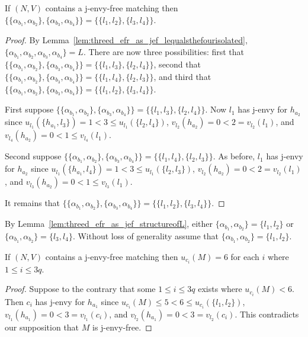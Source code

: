 \begin{lem}
\label{lem:threed_efr_as_jef_structureofL}
If $(N, V)$ contains a j-envy-free matching then $\{ \{ \alpha_{b_1}, \alpha_{b_2} \}, \{ \alpha_{b_3}, \alpha_{b_4} \} \} = \{ \{ l_1, l_2 \}, \{ l_3, l_4 \} \}$.
\end{lem}
\begin{proof}
By Lemma~\ref{lem:threed_efr_as_jef_lequalsthefourisolated}, $\{ \alpha_{b_1}, \alpha_{b_2}, \alpha_{b_3}, \alpha_{b_4} \} = L$. There are now three possibilities: first that $\{ \{ \alpha_{b_1}, \alpha_{b_2} \}, \{ \alpha_{b_3}, \alpha_{b_4} \} \} = \{ \{ l_1, l_3 \}, \{ l_2, l_4 \} \}$, second that $\{ \{ \alpha_{b_1}, \alpha_{b_2} \}, \{ \alpha_{b_3}, \alpha_{b_4} \} \} = \{ \{ l_1, l_4 \}, \{ l_2, l_3 \} \}$, and third that $\{ \{ \alpha_{b_1}, \alpha_{b_2} \}, \{ \alpha_{b_3}, \alpha_{b_4} \} \} = \{ \{ l_1, l_2 \}, \{ l_3, l_4 \} \}$.

First suppose $\{ \{ \alpha_{b_1}, \alpha_{b_2} \}, \{ \alpha_{b_3}, \alpha_{b_4} \} \} = \{ \{ l_1, l_3 \}, \{ l_2, l_4 \} \}$. Now $l_1$ has j-envy for $h_{a_2}$ since $u_{l_1}(\{ h_{a_1}, l_3 \}) = 1 < 3 \leq u_{l_1}(\{ l_2, l_4 \})$, $v_{l_2}(h_{a_2}) = 0 < 2 = v_{l_2}(l_1)$, and $v_{l_4}(h_{a_2}) = 0 < 1 \leq v_{l_4}(l_1)$.

Second suppose $\{ \{ \alpha_{b_1}, \alpha_{b_2} \}, \{ \alpha_{b_3}, \alpha_{b_4} \} \} = \{ \{ l_1, l_4 \}, \{ l_2, l_3 \} \}$. As before, $l_1$ has j-envy for $h_{a_2}$ since $u_{l_1}(\{ h_{a_1}, l_4 \}) = 1 < 3 \leq u_{l_1}(\{ l_2, l_3 \})$, $v_{l_2}(h_{a_2}) = 0 < 2 = v_{l_2}(l_1)$, and $v_{l_3}(h_{a_2}) = 0 < 1 \leq v_{l_3}(l_1)$.

It remains that $\{ \{ \alpha_{b_1}, \alpha_{b_2} \}, \{ \alpha_{b_3}, \alpha_{b_4} \} \} = \{ \{ l_1, l_2 \}, \{ l_3, l_4 \} \}$.
\end{proof}

By Lemma~\ref{lem:threed_efr_as_jef_structureofL}, either $\{ \alpha_{b_1}, \alpha_{b_2} \} = \{ l_1, l_2 \}$ or $\{ \alpha_{b_1}, \alpha_{b_2} \} = \{ l_3, l_4 \}$. Without loss of generality assume that $\{ \alpha_{b_1}, \alpha_{b_2} \} = \{ l_1, l_2 \}$.

\begin{lem}
\label{lem:threed_efr_as_jef_eachpigets6}
If $(N, V)$ contains a j-envy-free matching then $u_{c_i}(M) = 6$ for each $i$ where $1\leq i \leq 3q$.
\end{lem}
\begin{proof}
Suppose to the contrary that some $1\leq i \leq 3q$ exists where $u_{c_i}(M) < 6$. Then $c_i$ has j-envy for $h_{a_1}$ since $u_{c_i}(M) \leq 5 < 6 \leq u_{c_i}(\{ l_1, l_2 \})$, $v_{l_1}(h_{a_1}) = 0 < 3 = v_{l_1}(c_i)$, and $v_{l_2}(h_{a_1}) = 0 < 3 = v_{l_2}(c_i)$. This contradicts our supposition that $M$ is j-envy-free.
\end{proof}

